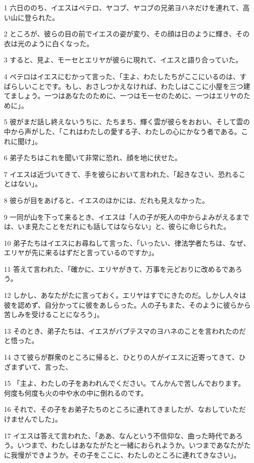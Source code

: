 \par 1 六日ののち、イエスはペテロ、ヤコブ、ヤコブの兄弟ヨハネだけを連れて、高い山に登られた。
\par 2 ところが、彼らの目の前でイエスの姿が変り、その顔は日のように輝き、その衣は光のように白くなった。
\par 3 すると、見よ、モーセとエリヤが彼らに現れて、イエスと語り合っていた。
\par 4 ペテロはイエスにむかって言った、「主よ、わたしたちがここにいるのは、すばらしいことです。もし、おさしつかえなければ、わたしはここに小屋を三つ建てましょう。一つはあなたのために、一つはモーセのために、一つはエリヤのために」。
\par 5 彼がまだ話し終えないうちに、たちまち、輝く雲が彼らをおおい、そして雲の中から声がした、「これはわたしの愛する子、わたしの心にかなう者である。これに聞け」。
\par 6 弟子たちはこれを聞いて非常に恐れ、顔を地に伏せた。
\par 7 イエスは近づいてきて、手を彼らにおいて言われた、「起きなさい、恐れることはない」。
\par 8 彼らが目をあげると、イエスのほかには、だれも見えなかった。
\par 9 一同が山を下って来るとき、イエスは「人の子が死人の中からよみがえるまでは、いま見たことをだれにも話してはならない」と、彼らに命じられた。
\par 10 弟子たちはイエスにお尋ねして言った、「いったい、律法学者たちは、なぜ、エリヤが先に来るはずだと言っているのですか」。
\par 11 答えて言われた、「確かに、エリヤがきて、万事を元どおりに改めるであろう。
\par 12 しかし、あなたがたに言っておく。エリヤはすでにきたのだ。しかし人々は彼を認めず、自分かってに彼をあしらった。人の子もまた、そのように彼らから苦しみを受けることになろう」。
\par 13 そのとき、弟子たちは、イエスがバプテスマのヨハネのことを言われたのだと悟った。
\par 14 さて彼らが群衆のところに帰ると、ひとりの人がイエスに近寄ってきて、ひざまずいて、言った、
\par 15 「主よ、わたしの子をあわれんでください。てんかんで苦しんでおります。何度も何度も火の中や水の中に倒れるのです。
\par 16 それで、その子をお弟子たちのところに連れてきましたが、なおしていただけませんでした」。
\par 17 イエスは答えて言われた、「ああ、なんという不信仰な、曲った時代であろう。いつまで、わたしはあなたがたと一緒におられようか。いつまであなたがたに我慢ができようか。その子をここに、わたしのところに連れてきなさい」。
